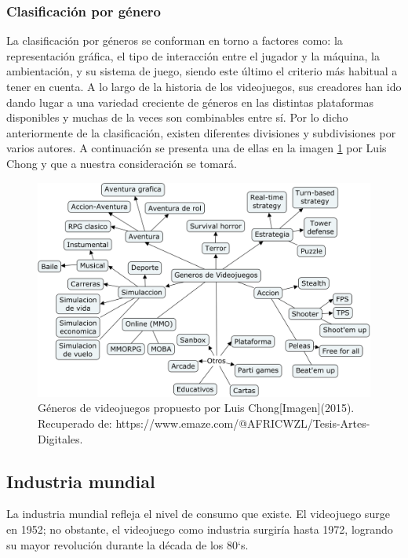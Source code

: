 	\subsubsection{Clasificación por género}
 La clasificación por géneros se conforman en torno a factores como: la representación gráfica, el tipo de interacción entre el jugador y la máquina, la ambientación, y su sistema de juego, siendo este último el criterio más habitual a tener en cuenta. A lo largo de la historia de los videojuegos, sus creadores han ido dando lugar a una variedad creciente de géneros en las distintas plataformas disponibles y muchas de la veces son combinables entre sí. Por lo dicho anteriormente de la clasificación, existen diferentes divisiones y subdivisiones por varios autores. A continuación se presenta una de ellas en la imagen \ref{fig:vidGen} por Luis Chong y que a nuestra consideración se tomará.
	\\[1pt]
	
	\begin{figure}
		\centering
		\includegraphics[width=\textwidth]{03MarcoTeorico/imageR/gene}
		\caption{Géneros de videojuegos propuesto por Luis Chong[Imagen](2015). Recuperado de: https://www.emaze.com/@AFRICWZL/Tesis-Artes-Digitales.}
		\label{fig:vidGen}
	\end{figure}	
	
		
\subsection{Industria mundial}
			 
			 La industria mundial refleja el nivel de consumo que existe. El videojuego surge en 1952; no obstante, el videojuego como industria surgiría hasta 1972, logrando su mayor revolución durante la década de los 80`s. 
			 \\[1pt]
			 
